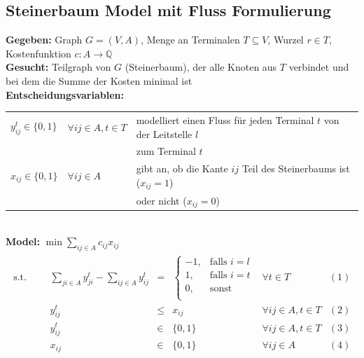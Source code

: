 \documentclass[11pt,a4paper]{article}
\newcommand{\Q}{\mathbb{Q}}
\theoremstyle{my_th_style1}
\begin{document}
\subsection*{Steinerbaum Model mit Fluss Formulierung}
\textbf{Gegeben:} Graph $G=(V,A)$, Menge an Terminalen $T \subseteq V $, Wurzel $r \in T$, Kostenfunktion $c:A \rightarrow \Q$\\
\textbf{Gesucht:} Teilgraph von $G$ (Steinerbaum), der alle Knoten aus $T$ verbindet und bei dem die Summe der Kosten minimal ist\\
\textbf{Entscheidungsvariablen:}\\
\begin{tabular}{lll}
	$y_{ij}^t \in \{0,1\}$ &$\forall ij \in A, t\in T $ & modelliert einen Fluss für jeden Terminal $t$ von der Leitstelle $l$\\
	&& zum Terminal $t$\\
	$x_{ij} \in \{0,1\}$ & $\forall ij \in A$ &gibt an, ob die Kante $ij$ Teil des Steinerbaums ist ($x_{ij}=1$)\\
	&& oder nicht ($x_{ij}=0$)\\
\end{tabular}\\
\textbf{Model:}
$\min \displaystyle\sum_{ij \in A} c_{ij} x_{ij} $
\begin{align}
\begin{array}{rcrcrcll}
\textrm{s.t.}  
&& &\displaystyle\sum_{ji \in A} y_{ji}^t - \displaystyle\sum_{ij \in A} y_{ij}^t& = & \left\{\begin{array}{rl} 
-1, & \text{falls } i=l\\ 
1, & \text{falls } i=t\\ 
0, & \text{sonst}\\ 
\end{array}
\right. & \forall t \in T & (1) \\
  &&& y_{ij}^t & \leq & x_{ij} & \forall ij \in A, t\in T & (2)\\
&&& y_{ij}^t & \in & \{0,1 \}& \forall ij \in A , t \in T& (3)\\
&&& x_{ij} & \in & \{0,1\}& \forall ij \in A & (4)\\
\end{array}
\label{SteinerbaumModel}
\end{align}
\end{document}
